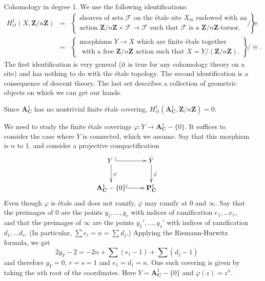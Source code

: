 \medskip\noindent
Cohomology in degree 1. We use the following identifications:
\begin{eqnarray*}
H_{et}^1 (X, \mathbf{Z}/n\mathbf{Z}) & = & \left\{
\begin{matrix}
\text{sheaves of sets $\mathcal{F}$ on the \'etale site $X_{\text{\'et}}$ 
endowed with an} \\
\text{action $\mathbf{Z}/n\mathbf{Z} \times \mathcal{F} \to \mathcal{F}$ such 
that $\mathcal{F}$ is a $\mathbf{Z}/n\mathbf{Z}$-torsor.}
\end{matrix}
\right\}
\Big/ \cong 
\\
& = & \left\{
\begin{matrix}
\text{morphisms $Y \to X$ which are finite \'etale together} \\
\text{ with a free $\mathbf{Z}/n\mathbf{Z}$ action such that $X = Y 
/(\mathbf{Z}/n\mathbf{Z})$.}
\end{matrix}
\right\}
\Big/ \cong.
\end{eqnarray*}
The first identification is very general (it is true for any cohomology theory 
on a site) and has nothing to do with the \'etale topology. The second 
identification is a consequence of descent theory. The last set describes a 
collection of geometric objects on which we can get our hands.

\medskip\noindent
Since $\mathbf{A}^1_\mathbf{C}$ has no nontrivial finite \'etale covering, 
$H_{et}^1 (\mathbf{A}^1_\mathbf{C}, \mathbf{Z}/n\mathbf{Z}) = 0$.

\medskip\noindent
We need to study the finite \'etale coverings $\varphi: Y \to 
\mathbf{A}^1_\mathbf{C}-\{0\}$. It suffices to consider the case where $Y$ is 
connected, which we assume. Say that this morphism is $n$ to 1, and consider a 
projective compactification
$$
\xymatrix{
{Y\ } \ar@{^{(}->}[r] \ar^{\varphi}[d] & {\bar Y} \ar^{\bar\varphi}[d] \\
{\mathbf{A}^1_\mathbf{C}-\{0\}} \ar@{^{(}->}[r]  &{\mathbf{P}^1_\mathbf{C}}
}
$$
Even though $\varphi$ is \'etale and does not ramify, $\bar{\varphi}$ may 
ramify at 0 and $\infty$. Say that the preimages of 0 are the points $y_1, 
\dots, y_r$ with indices of ramification $e_1, \dots e_r$, and that the 
preimages of $\infty$ are the points $y_1', \dots, y_s'$ with indices of 
ramification $d_1, \dots d_s$. (In particular, $\sum e_i = n = \sum d_j$.) 
Applying the Riemann-Hurwitz formula, we get
$$
2 g_Y - 2 = -2n + \sum (e_i - 1) + \sum (d_j - 1)
$$
and therefore $g_Y = 0$, $r=s=1$ and $e_1 = d_1 = n$. One such covering is 
given by taking the $n$th root of the coordinates. Here $Y = 
{\mathbf{A}^1_\mathbf{C}-\{0\}}$ and $\varphi (z) = z^n$. 

